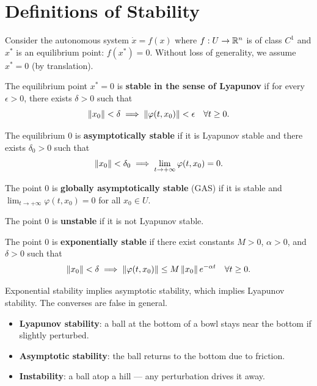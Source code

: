 \section{Definitions of Stability}

Consider the autonomous system $\dot{x} = f(x)$ where $f : U \to \mathbb{R}^n$ is
of class $C^1$ and $x^*$ is an equilibrium point: $f(x^*) = 0$. Without loss
of generality, we assume $x^* = 0$ (by translation).

\begin{definition}
The equilibrium point $x^* = 0$ is \textbf{stable in the sense of Lyapunov}
if for every $\epsilon > 0$, there exists $\delta > 0$ such that
\[
    \left\| x_0 \right\| < \delta \implies \left\| \varphi(t, x_0) \right\| < \epsilon
    \quad \forall t \geq 0.
\]
\end{definition}

\begin{definition}
The equilibrium $0$ is \textbf{asymptotically stable} if it is Lyapunov
stable and there exists $\delta_0 > 0$ such that
\[
    \left\| x_0 \right\| < \delta_0 \implies \lim_{t \to +\infty} \varphi(t, x_0) = 0.
\]
\end{definition}

\begin{definition}
The point $0$ is \textbf{globally asymptotically stable} (GAS) if it is
stable and $\lim_{t \to +\infty} \varphi(t, x_0) = 0$ for all $x_0 \in U$.
\end{definition}

\begin{definition}[Instability]
The point $0$ is \textbf{unstable} if it is not Lyapunov stable.
\end{definition}

\begin{definition}
The point $0$ is \textbf{exponentially stable} if there exist constants
$M > 0$, $\alpha > 0$, and $\delta > 0$ such that
\[
    \left\| x_0 \right\| < \delta \implies \left\| \varphi(t, x_0) \right\| \leq M\left\| x_0 \right\|
    e^{-\alpha t} \quad \forall t \geq 0.
\]
\end{definition}

\begin{remark}
Exponential stability implies asymptotic stability, which implies Lyapunov
stability. The converses are false in general.
\end{remark}

\begin{intuition}
\begin{itemize}
    \item \textbf{Lyapunov stability}: a ball at the bottom of a bowl stays
    near the bottom if slightly perturbed.
    \item \textbf{Asymptotic stability}: the ball returns to the bottom due
    to friction.
    \item \textbf{Instability}: a ball atop a hill --- any perturbation
    drives it away.
\end{itemize}
\end{intuition}

